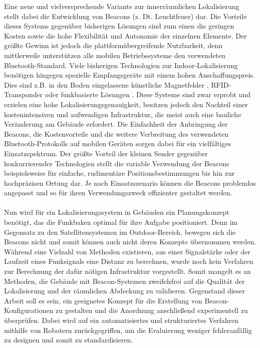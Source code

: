 Eine neue und vielversprechende Variante zur innerräumlichen Lokalisierung stellt dabei die Entwicklung von Beacons (z. Dt. Leuchtfeuer) dar. Die Vorteile dieses Systems gegenüber bisherigen Lösungen sind zum einen die geringen Kosten sowie die hohe Flexibilität und Autonomie der einzelnen Elemente. Der größte Gewinn ist jedoch die plattformübergreifende Nutzbarkeit, denn mittlerweile unterstützen alle mobilen Betriebssysteme den verwendeten Bluetooth-Standard. Viele bisherigen Technologien zur Indoor-Lokalisierung benötigen hingegen spezielle Empfangsgeräte mit einem hohen Anschaffungspreis. Dies sind z.B. in den Boden eingelassene künstliche Magnetfelder \cite{Magnet}, RFID-Transponder \cite{RFID} oder funkbasierte Lösungen \cite{WLAN}. Diese Systeme sind zwar erprobt und erzielen eine hohe Lokalisierungsgenauigkeit, besitzen jedoch den Nachteil einer kostenintensiven und aufwendigen Infrastruktur, die meist auch eine bauliche Veränderung am Gebäude erfordert. Die Einfachheit der Anbringung der Beacons, die Kostenvorteile und die weitere Verbreitung des verwendeten Bluetooth-Protokolls auf mobilen Geräten sorgen dabei für ein vielfältiges Einsatzspektrum. Der größte Vorteil der kleinen Sender gegenüber konkurrierender Technologien stellt die variable Verwendung der Beacons beispielsweise für einfache, rudimentäre Positionsbestimmungen bis hin zur hochpräzisen Ortung dar. Je nach Einsatzszenario können die Beacons problemlos angepasst und so für ihren Verwendungszweck effizienter gestaltet werden.\\ \\
Nun wird für ein Lokalisierungssystem in Gebäuden ein Planungskonzept benötigt, das die Funkbaken optimal für ihre Aufgabe positioniert. Denn im Gegensatz zu den Satellitensystemen im Outdoor-Bereich, bewegen sich die Beacons nicht und somit können auch nicht deren Konzepte übernommen werden. Während eine Vielzahl von Methoden existieren, aus einer Signalstärke oder der Laufzeit eines Funksignals eine Distanz zu berechnen, wurde noch kein Verfahren zur Berechnung der dafür nötigen Infrastruktur vorgestellt. Somit mangelt es an Methoden, die Gebäude mit Beacon-Systemen zweifelsfrei auf die Qualität der Lokalisierung und der räumlichen Abdeckung zu validieren. Gegenstand dieser Arbeit soll es sein, ein geeignetes Konzept für die Erstellung von Beacon-Konfigurationen zu gestalten und die Anordnung anschließend experimentell zu überprüfen. Dabei wird auf ein automatisiertes und strukturiertes Verfahren mithilfe von Robotern zurückgegriffen, um die Evaluierung weniger fehleranfällig zu designen und somit zu standardisieren.\\ \\
